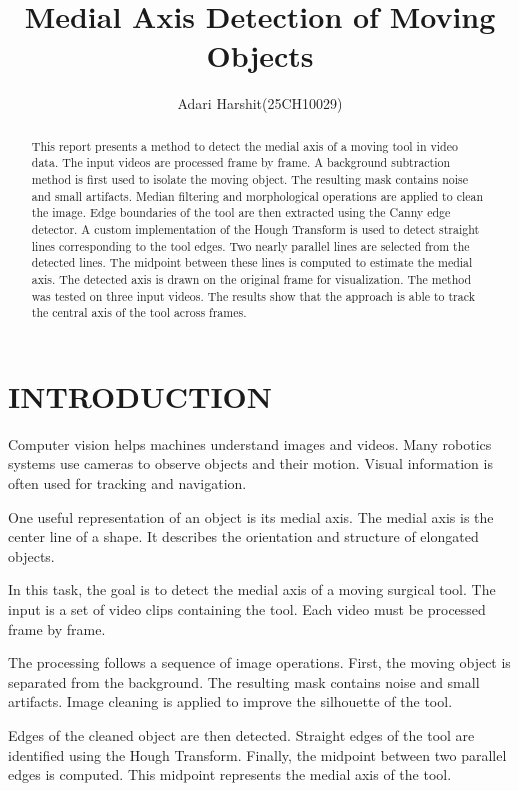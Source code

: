 \documentclass[letterpaper,10pt,conference]{ieeeconf}
\title{Medial Axis Detection of Moving Objects}
\author{Adari Harshit(25CH10029)}
\begin{document}
\maketitle

\begin{abstract}

This report presents a method to detect the medial axis of a moving tool in video data. 
The input videos are processed frame by frame. A background subtraction method is first used to isolate the moving object. 
The resulting mask contains noise and small artifacts. Median filtering and morphological operations are applied to clean the image. 
Edge boundaries of the tool are then extracted using the Canny edge detector. 
A custom implementation of the Hough Transform is used to detect straight lines corresponding to the tool edges. 
Two nearly parallel lines are selected from the detected lines. 
The midpoint between these lines is computed to estimate the medial axis. 
The detected axis is drawn on the original frame for visualization. 
The method was tested on three input videos. 
The results show that the approach is able to track the central axis of the tool across frames.

\end{abstract}


\section{INTRODUCTION}

Computer vision helps machines understand images and videos. 
Many robotics systems use cameras to observe objects and their motion. 
Visual information is often used for tracking and navigation.

One useful representation of an object is its medial axis. 
The medial axis is the center line of a shape. 
It describes the orientation and structure of elongated objects.

In this task, the goal is to detect the medial axis of a moving surgical tool. 
The input is a set of video clips containing the tool. 
Each video must be processed frame by frame.

The processing follows a sequence of image operations. 
First, the moving object is separated from the background. 
The resulting mask contains noise and small artifacts. 
Image cleaning is applied to improve the silhouette of the tool.

Edges of the cleaned object are then detected. 
Straight edges of the tool are identified using the Hough Transform. 
Finally, the midpoint between two parallel edges is computed. 
This midpoint represents the medial axis of the tool.
\end{document}
